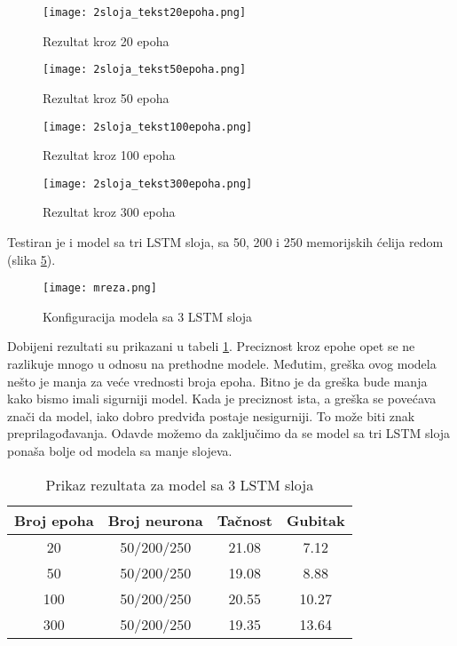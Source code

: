 \documentclass[a4paper]{article}
\begin{document}
\begin{figure}[!h]
    \centering
    \texttt{[image: 2sloja\_tekst20epoha.png]}
    \caption{Rezultat kroz 20 epoha}
    \label{fig:Rezultat20e100n200n}
\end{figure}
\begin{figure}[!h]
    \centering
    \texttt{[image: 2sloja\_tekst50epoha.png]}
    \caption{Rezultat kroz 50 epoha}
    \label{fig:Rezultat50e100n200n}
\end{figure}


\begin{figure}[!h]
    \centering
    \texttt{[image: 2sloja\_tekst100epoha.png]}
    \caption{Rezultat kroz 100 epoha}
    \label{fig:Rezultat100e100n200n}
\end{figure}

\begin{figure}[!h]
    \centering
    \texttt{[image: 2sloja\_tekst300epoha.png]}
    \caption{Rezultat kroz 300 epoha}
    \label{fig:Rezultat300e100n200n}
\end{figure}

Testiran je i model sa tri LSTM sloja, sa 50, 200 i 250 memorijskih ćelija redom (slika \ref{fig:mreza}).
\begin{figure}[!h]
    \centering
    \texttt{[image: mreza.png]}
    \caption{Konfiguracija modela sa 3 LSTM sloja}
    \label{fig:mreza}
\end{figure}
Dobijeni rezultati su prikazani u tabeli \ref{tab:tabela2}. Preciznost kroz epohe opet se ne razlikuje mnogo u odnosu na prethodne modele. Međutim, greška ovog modela nešto je manja za veće vrednosti broja epoha. Bitno je da greška bude manja kako bismo imali sigurniji model. Kada je preciznost ista, a greška se povećava znači da model, iako dobro predviđa postaje nesigurniji. To može biti znak preprilagođavanja. Odavde možemo da zaključimo da se model sa tri LSTM sloja ponaša bolje od modela sa manje slojeva.

\begin{table}[!h]
    \centering
    \begin{tabular}{|| c c c c ||}
    \hline
    \rowcolor{lightgray!60}Broj epoha & Broj neurona & Tačnost & Gubitak \\
    \hline\hline
    \rowcolor{orange!40} 20 & 50/200/250 & 21.08 & 7.12 \\ 
    \rowcolor{orange!60} 50 & 50/200/250 & 19.08 & 8.88\\
    \rowcolor{orange!80} 100 & 50/200/250 & 20.55 & 10.27 \\
    \rowcolor{orange} 300 & 50/200/250 & 19.35 & 13.64 \\
     \hline
    \end{tabular}
    \caption{Prikaz rezultata za model sa 3 LSTM sloja}
    \label{tab:tabela2}
\end{table}
\end{document}
